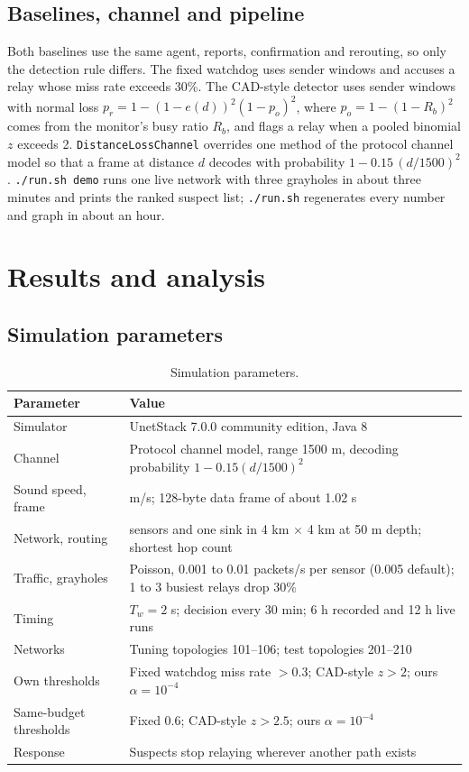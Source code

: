 \documentclass{article}
\begin{document}
\subsection{Baselines, channel and pipeline}
\noindent
Both baselines use the same agent, reports, confirmation and rerouting, so only the detection rule differs. The fixed watchdog uses sender windows and accuses a relay whose miss rate exceeds 30\%. The CAD-style detector uses sender windows with normal loss $p_r = 1-(1-e(d))^2(1-p_o)^2$, where $p_o = 1-(1-R_b)^2$ comes from the monitor's busy ratio $R_b$, and flags a relay when a pooled binomial $z$ exceeds 2. \texttt{DistanceLossChannel} overrides one method of the protocol channel model so that a frame at distance $d$ decodes with probability $1-0.15\,(d/1500)^2$. \texttt{./run.sh demo} runs one live network with three grayholes in about three minutes and prints the ranked suspect list; \texttt{./run.sh} regenerates every number and graph in about an hour.

\section{Results and analysis}\label{sec:results}

\subsection{Simulation parameters}
\begin{table}[htbp]
\centering\small{}
\caption{Simulation parameters.}\label{tab:params}
\begin{tabular}{>{\raggedright\arraybackslash}p{3.4cm} >{\raggedright\arraybackslash}p{10.3cm}}
\toprule
Parameter & Value \\
\midrule
Simulator & UnetStack 7.0.0 community edition, Java 8 \\
Channel & Protocol channel model, range 1500 m, decoding probability $1-0.15(d/1500)^2$ \\
Sound speed, frame & 1500 m/s; 128-byte data frame of about 1.02 s \\
Network, routing & 20 sensors and one sink in 4 km $\times$ 4 km at 50 m depth; shortest hop count \\
Traffic, grayholes & Poisson, 0.001 to 0.01 packets/s per sensor (0.005 default); 1 to 3 busiest relays drop 30\% \\
Timing & $T_w = 2$ s; decision every 30 min; 6 h recorded and 12 h live runs \\
Networks & Tuning topologies 101--106; test topologies 201--210 \\
Own thresholds & Fixed watchdog miss rate $> 0.3$; CAD-style $z > 2$; ours $\alpha = 10^{-4}$ \\
Same-budget thresholds & Fixed 0.6; CAD-style $z > 2.5$; ours $\alpha = 10^{-4}$ \\
Response & Suspects stop relaying wherever another path exists \\
\bottomrule
\end{tabular}
\end{table}
\end{document}
